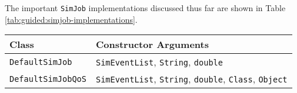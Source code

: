 The important \lstinline|SimJob| implementations
  discussed thus far are shown
  in Table \ref{tab:guided:simjob-implementations}.

\begin{table}
\label{tab:guided:simjob-implementations}
\caption{Important \texttt{SimJob} Implementations.}
\begin{longtabu}{|l|l|}
\hline
Class & Constructor Arguments \\ \hline
\lstinline|DefaultSimJob|     & \lstinline|SimEventList|, \lstinline|String|, \lstinline|double|
  \\ \hline
\lstinline|DefaultSimJobQoS|  & \lstinline|SimEventList|, \lstinline|String|, \lstinline|double|, \lstinline|Class|, \lstinline|Object|
  \\ \hline
\end{longtabu}
\end{table}

